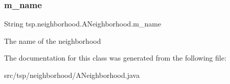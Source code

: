\subsubsection{\texorpdfstring{m\+\_\+name}{m\_name}}
{\footnotesize\ttfamily String tsp.\+neighborhood.\+A\+Neighborhood.\+m\+\_\+name\hspace{0.3cm}{\ttfamily [protected]}}

The name of the neighborhood 

The documentation for this class was generated from the following file\+:\begin{DoxyCompactItemize}
\item 
src/tsp/neighborhood/A\+Neighborhood.\+java\end{DoxyCompactItemize}

